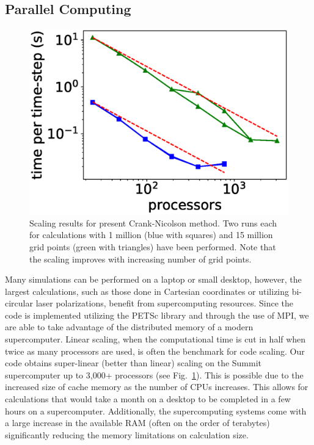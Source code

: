\subsection{Parallel Computing} %
\label{sub:parallel_computing}
\begin{figure}[!ht]
\centering
\includegraphics[width=0.5\columnwidth]{figs/Rydberg/multi_node.eps}
\caption{\label{fig:scaling} Scaling results for present Crank-Nicolson method. Two runs each for calculations with 1 million (blue with squares) and 15 million grid points (green with triangles) have been performed. Note that the scaling improves with increasing number of grid points.
}
\end{figure}
Many simulations can be performed on a laptop or small desktop, however, the largest calculations, such as those done in Cartesian coordinates or utilizing bi-circular laser polarizations, benefit from supercomputing resources. Since the code is implemented utilizing the PETSc library and through the use of MPI, we are able to take advantage of the distributed memory of a modern supercomputer. Linear scaling, when the computational time is cut in half when twice as many processors are used, is often the benchmark for code scaling. Our code obtains super-linear (better than linear) scaling on the Summit supercomputer up to 3,000+ processors (see Fig.~\ref{fig:scaling}). This is possible due to the increased size of cache memory as the number of CPUs increases. This allows for calculations that would take a month on a desktop to be completed in a few hours on a supercomputer. Additionally, the supercomputing systems come with a large increase in the available RAM (often on the order of terabytes) significantly reducing the memory limitations on calculation size.




